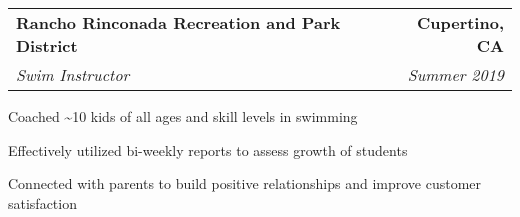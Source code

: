 \documentclass{article}
\newlength{\secskip}
\begin{document}
\goodbreak\vspace{\secskip}\par\noindent\begin{tabularx}{\linewidth}{Xr}
    \textbf{Rancho Rinconada Recreation and Park District} & \textbf{Cupertino, CA}\\
    \textit{Swim Instructor} & \textit{Summer 2019}\\
\end{tabularx}
\begin{compactitem}
    \item Coached \textasciitilde{}10 kids of all ages and skill levels in swimming
    \item Effectively utilized bi-weekly reports to assess growth of students
    \item Connected with parents to build positive relationships and improve customer satisfaction
\end{compactitem}

    
\end{document}
